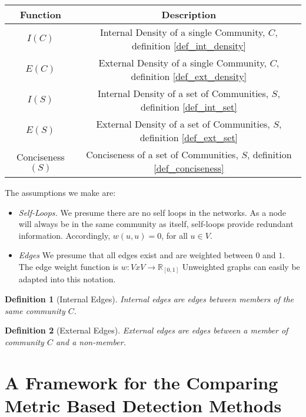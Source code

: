 \documentclass[phd,tocprelim]{cornell}
\newtheorem{definition}{Definition}
\renewcommand{\caption}[1]{\singlespacing\hangcaption{#1}\normalspacing}
\begin{document}
\begin{table}[ht]
\caption{Introduced Functions}
\begin{center}
\begin{tabular}{|c|c|} \hline
Function & Description \\ \hline
$I(C)$ & Internal Density of a single Community, $C$, definition \ref{def_int_density} \\ \hline
$E(C)$ & External Density of a single Community, $C$, definition  \ref{def_ext_density} \\ \hline
$I(S)$ & Internal Density of a set of Communities, $S$, definition \ref{def_int_set} \\ \hline
$E(S)$ & External Density of a set of Communities, $S$, definition \ref{def_ext_set} \\ \hline
{\sc Conciseness}$(S)$ & Conciseness of a set of Communities, $S$, definition \ref{def_conciseness} \\ \hline
\end{tabular}
\end{center}
\label{table_new_functions}
\end{table}

The assumptions we make are:
\begin{itemize}
\item {\it Self-Loops.}  We presume there are no self loops in the networks.  As a node will always be in the same community as itself, self-loops provide redundant information.  Accordingly, $w(u, u) = 0$, for all $u \in V$.
\item {\it Edges} We presume that all edges exist and are weighted between $0$ and $1$.  The edge weight function is $w : VxV \rightarrow \mathbb{R}_{[0, 1]}$  Unweighted graphs can easily be adapted into this notation.
\end{itemize}

\begin{definition}[Internal Edges]
Internal edges are edges between members of the same community $C$.
\end{definition}

\begin{definition}[External Edges]
External edges are edges between a member of community $C$ and a non-member.
\end{definition}


\chapter{A Framework for the Comparing Metric Based Detection Methods}
\end{document}
